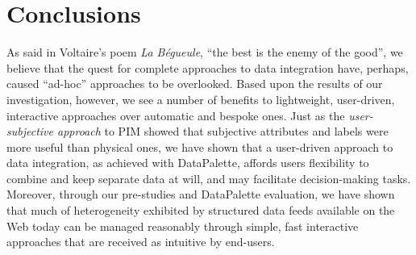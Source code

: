 \documentclass{sigchi}
\begin{document}
%
%
%

\section{Conclusions} %

As said in Voltaire's poem \emph{La B\'{e}gueule}, ``the best is the enemy of the good'', we believe that the quest for complete approaches to data integration have, perhaps, caused ``ad-hoc'' approaches to be overlooked.  Based upon the results of our investigation, however, we see a number of benefits to lightweight, user-driven, interactive approaches over automatic and bespoke ones. Just as the \emph{user-subjective approach} to PIM \cite{user-subjective} showed that subjective attributes and labels were more useful than physical ones, we have shown that a user-driven approach to data integration, as achieved with DataPalette, affords users flexibility to combine and keep separate data at will, and may facilitate decision-making tasks.  Moreover, through our pre-studies and DataPalette evaluation, we have shown that much of heterogeneity exhibited by structured data feeds available on the Web today can be managed reasonably through simple, fast interactive approaches that are received as intuitive by end-users. 


\end{document}
